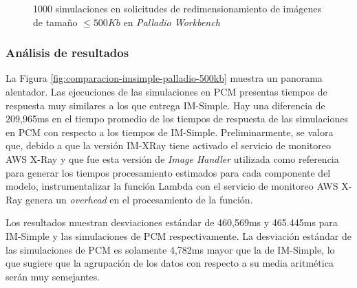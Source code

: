 \begin{figure}[h]
\hspace{-2cm}
\caption{1000 simulaciones en solicitudes de redimensionamiento de imágenes de tamaño $\leq 500Kb$ en \emph{Palladio Workbench}}
\label{fig:funcion-acumulada-palladio-500kb}
\end{figure}

\subsubsection{Análisis de resultados} 
La Figura \ref{fig:comparacion-imsimple-palladio-500kb} muestra un panorama alentador. Las ejecuciones de las simulaciones en PCM presentas tiempos de respuesta muy similares a los que entrega IM-Simple. Hay una diferencia de 209,965ms en el tiempo promedio de los tiempos de respuesta de las simulaciones en PCM con respecto a los tiempos de IM-Simple. Preliminarmente, se valora que, debido a que la versión IM-XRay tiene activado el servicio de monitoreo AWS X-Ray y que fue esta versión de \emph{Image Handler} utilizada como referencia para generar los tiempos procesamiento estimados para cada componente del modelo, instrumentalizar la función Lambda con el servicio de monitoreo AWS X-Ray genera un \emph{overhead} en el procesamiento de la función.

Los resultados muestran desviaciones estándar de 460,569ms y 465.445ms para IM-Simple y las simulaciones de PCM respectivamente. La desviación estándar de las simulaciones de PCM es solamente 4,782ms mayor que la de IM-Simple, lo que sugiere que la agrupación de los datos con respecto a su media aritmética serán muy semejantes.

